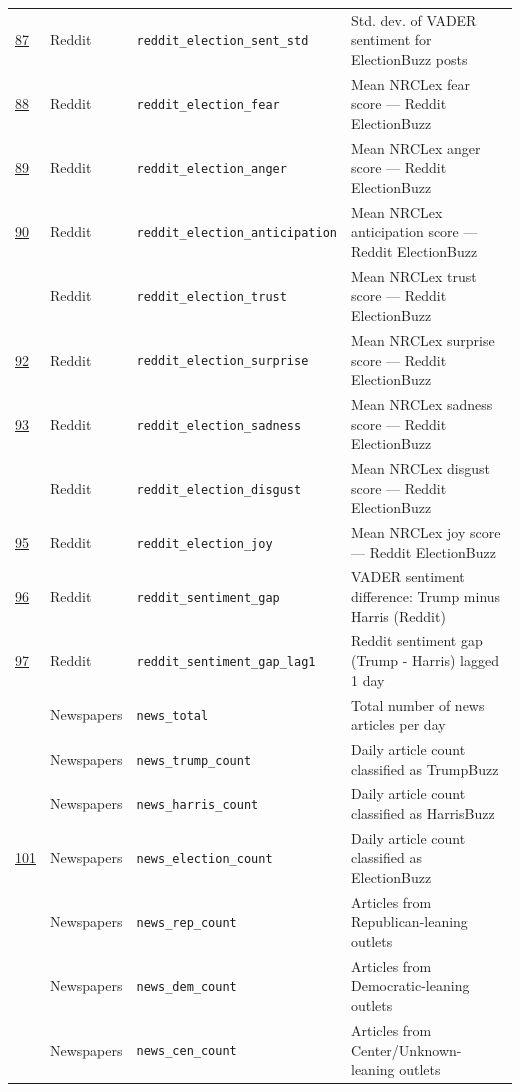 \begin{longtable}{>{\centering\arraybackslash}p{0.9cm} p{2cm} p{4cm} p{7.5cm}}
\underline{87} & Reddit & \texttt{reddit\_election\_sent\_std} & Std. dev. of VADER sentiment for ElectionBuzz posts \\
\underline{88} & Reddit & \texttt{reddit\_election\_fear} & Mean NRCLex fear score --- Reddit ElectionBuzz \\
\underline{89} & Reddit & \texttt{reddit\_election\_anger} & Mean NRCLex anger score --- Reddit ElectionBuzz \\
\underline{90} & Reddit & \texttt{reddit\_election\_anticipation} & Mean NRCLex anticipation score --- Reddit ElectionBuzz \\
91 & Reddit & \texttt{reddit\_election\_trust} & Mean NRCLex trust score --- Reddit ElectionBuzz \\
\underline{92} & Reddit & \texttt{reddit\_election\_surprise} & Mean NRCLex surprise score --- Reddit ElectionBuzz \\
\underline{93} & Reddit & \texttt{reddit\_election\_sadness} & Mean NRCLex sadness score --- Reddit ElectionBuzz \\
94 & Reddit & \texttt{reddit\_election\_disgust} & Mean NRCLex disgust score --- Reddit ElectionBuzz \\
\underline{95} & Reddit & \texttt{reddit\_election\_joy} & Mean NRCLex joy score --- Reddit ElectionBuzz \\
\underline{96} & Reddit & \texttt{reddit\_sentiment\_gap} & VADER sentiment difference: Trump minus Harris (Reddit) \\
\underline{97} & Reddit & \texttt{reddit\_sentiment\_gap\_lag1} & Reddit sentiment gap (Trump - Harris) lagged 1 day \\
98 & Newspapers & \texttt{news\_total} & Total number of news articles per day \\
99 & Newspapers & \texttt{news\_trump\_count} & Daily article count classified as TrumpBuzz \\
100 & Newspapers & \texttt{news\_harris\_count} & Daily article count classified as HarrisBuzz \\
\underline{101} & Newspapers & \texttt{news\_election\_count} & Daily article count classified as ElectionBuzz \\
102 & Newspapers & \texttt{news\_rep\_count} & Articles from Republican-leaning outlets \\
103 & Newspapers & \texttt{news\_dem\_count} & Articles from Democratic-leaning outlets \\
104 & Newspapers & \texttt{news\_cen\_count} & Articles from Center/Unknown-leaning outlets \\

\end{longtable}

